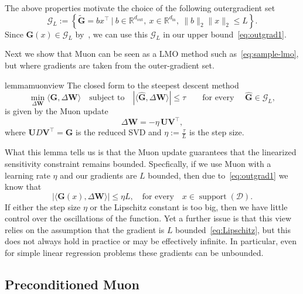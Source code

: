 \documentclass[11pt]{article}
\DeclareMathOperator{\support}{support}
\newcommand{\mat}[1]{\bm{#1}}
\newcommand{\cD}{\mathcal{D}}
\newcommand{\ip}[1]{\langle #1 \rangle}
\begin{document}
\noindent The above properties motivate the choice of the following outergradient set
\begin{equation} 
\label{eq:outgrad} 
\mathcal{G}_L := \left \{ \widetilde{\mat{G}} = b x^\top ~\bigg |~  
b\in\mathbb{R}^{d_{\mathrm{out}}},
    \ x\in\mathbb{R}^{d_{\mathrm{in}}}, \
\|b\|_2\|x\|_2 \leq L \right \}.
\end{equation}
Since $\mat{G}(x) \in \mathcal{G}_L$ by~, we can use this $\mathcal{G}_L$ in our upper bound~\eqref{eq:outgrad1}.

Next we show that Muon can be seen as a LMO method such as~\eqref{eq:sample-lmo}, but where gradients are taken from the outer-gradient set.
  \begin{restatable}[Loss bounded View of Muon]{lemma}{muonview}  \label{lem:muon}
The closed form to the steepest descent method
\begin{equation}\label{eq:muon-alt}
    \min_{\Delta\mat{W}} \ip{\mat{G}, \Delta\mat{W}} \quad \mbox{subject to} \quad
|\langle \hat{\mat{G}},\Delta\mat{W} \rangle| \le \tau \qquad \text{for  every }\quad  \hat{\mat{G}} \in \mathcal{G}_L,
\end{equation}
is given by the Muon update
\[ \Delta\mat{W} =  - \eta  \,\mat{U} \mat{V}^\top,\]
where $\mat{U}  D \mat{V}^\top = \mat{G}$  is the reduced SVD and $ \eta:= \frac{\tau}{L} $ is the step size.
\end{restatable}

What this lemma tells us is that  the Muon update guarantees that the linearized sensitivity constraint remains bounded. Specfically, if we use Muon with a learning rate $\eta$ and our gradients are $L$ bounded, then due to~\eqref{eq:outgrad1} we know that 
\[ |\ip{\mat{G}(x), \Delta\mat{W}} | \leq \eta L, \quad \mbox{for every} \quad x \in \support(\cD). \]
If either the step size $\eta$ or the Lipschitz constant is too big, then we have little control over the oscillations of the function. 
Yet a further issue is that this view relies on the assumption that the gradient is $L$ bounded~\eqref{eq:Lipschitz}, but this does not always hold in practice or may be effectively infinite. In particular, even for simple linear regression problems these gradients can be unbounded. 

\subsection{Preconditioned Muon}\label{sec:preconditioned-muon}
\end{document}
